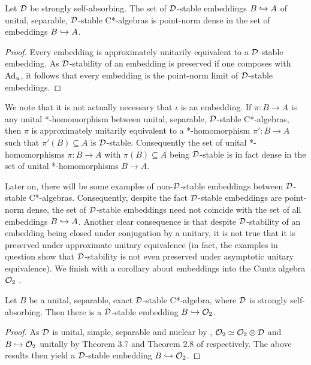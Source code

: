 \documentclass[12pt]{amsart}
\begin{document}
      \begin{cor}\label{pointnormdensity}
          Let $\mathcal{D}$ be strongly self-absorbing. The set of $\mathcal{D}$-stable embeddings $B \hookrightarrow A$ of unital, separable, $\mathcal{D}$-stable C*-algebras is point-norm dense in the set of embeddings $B \hookrightarrow A$.
            \begin{proof}
              Every embedding is approximately unitarily equivalent to a $\mathcal{D}$-stable embedding. As $\mathcal{D}$-stability of an embedding is preserved if one composes with $\text{Ad}_u$, it follows that every embedding is the point-norm limit of $\mathcal{D}$-stable embeddings.
            \end{proof}
        \end{cor}

        \begin{remark}\label{homomorphisminsteadofembedding}
          We note that it is not actually necessary that $\iota$ is an embedding. If $\pi: B \to A$ is any unital *-homomorphism between unital, separable, $\mathcal{D}$-stable C*-algebras, then $\pi$ is approximately unitarily equivalent to a *-homomorphism $\pi': B \to A$ such that $\pi'(B) \subseteq A$ is $\mathcal{D}$-stable. Consequently the set of unital *-homomorphisms $\pi: B \to A$ with $\pi(B) \subseteq A$ being $\mathcal{D}$-stable is in fact dense in the set of unital *-homomorphisms $B \to A$.
        \end{remark}

        Later on, there will be some examples of non-$\mathcal{D}$-stable embeddings between $\mathcal{D}$-stable C*-algebras. Consequently, despite the fact $\mathcal{D}$-stable embeddings are point-norm dense, the set of $\mathcal{D}$-stable embeddings need not coincide with the set of all embeddings $B \hookrightarrow A$. Another clear consequence is that despite $\mathcal{D}$-stability of an embedding being closed under conjugation by a unitary, it is not true that it is preserved under approximate unitary equivalence (in fact, the examples in question show that $\mathcal{D}$-stability is not even preserved under asymptotic unitary equivalence). We finish with a corollary about embeddings into the Cuntz algebra  $\mathcal{O}_2$ \cite{Cuntz77}. 

          \begin{cor}
            Let $B$ be a unital, separable, exact $\mathcal{D}$-stable C*-algebra, where $\mathcal{D}$ is strongly self-absorbing. Then there is a $\mathcal{D}$-stable embedding $B \hookrightarrow \mathcal{O}_2$. 
              \begin{proof}
                As $\mathcal{D}$ is unital, simple, separable and nuclear by \cite[Section 1.6]{TomsWinter07}, $\mathcal{O}_2 \simeq \mathcal{O}_2 \otimes \mathcal{D}$ and $B \hookrightarrow \mathcal{O}_2$ unitally by Theorem 3.7 and Theorem 2.8 of \cite{KirchbergPhillips00} respectively. The above results then yield a $\mathcal{D}$-stable embedding $B \hookrightarrow \mathcal{O}_2$. 
              \end{proof}
          \end{cor}
\end{document}
